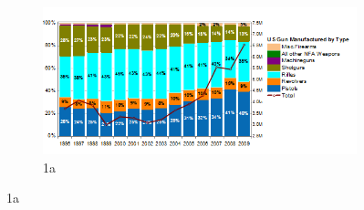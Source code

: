 \documentclass{article}
\begin{document}
\begin{figure}
  \centering

  \begin{subfigure}{0.6\textwidth}  %
    \centering
    \includegraphics[width=0.8\linewidth]{fig/fig3.png} %
    \caption{1a}
    \label{fig:comb_1a}
  \end{subfigure}  %


\end{figure}
\end{document}
